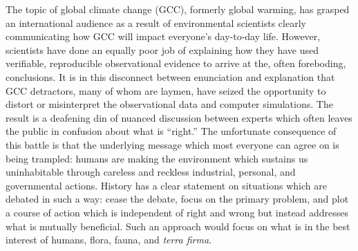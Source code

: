 \documentclass[11pt]{article}
\begin{document}
The topic of global climate change (GCC), formerly global warming, has
grasped an international audience as a result of environmental
scientists clearly communicating how GCC will impact everyone's
day-to-day life. However, scientists have done an equally poor job of
explaining how they have used verifiable, reproducible observational
evidence to arrive at the, often foreboding, conclusions. It is in
this disconnect between enunciation and explanation that GCC
detractors, many of whom are laymen, have seized the opportunity to
distort or misinterpret the observational data and computer
simulations. The result is a deafening din of nuanced discussion
between experts which often leaves the public in confusion about what
is ``right.'' The unfortunate consequence of this battle is that the
underlying message which most everyone can agree on is being trampled:
humans are making the environment which sustains us uninhabitable
through careless and reckless industrial, personal, and governmental
actions. History has a clear statement on situations which are debated
in such a way: cease the debate, focus on the primary problem, and
plot a course of action which is independent of right and wrong but
instead addresses what is mutually beneficial. Such an approach would
focus on what is in the best interest of humans, flora, fauna, and
{\it{terra firma}}.
\end{document}
